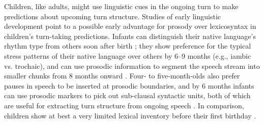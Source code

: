 \documentclass[authoryear, 12pt]{elsarticle}
\begin{document}
Children, like adults, might use linguistic cues in the ongoing turn to make predictions about upcoming turn structure. Studies of early linguistic development point to a possible early advantage for prosody over lexicosyntax in children's turn-taking predictions. Infants can distinguish their native language's rhythm type from others soon after birth \citep{mehler1988, nazzi2003}; they show preference for the typical stress patterns of their native language over others by 6--9 months (e.g., iambic vs. trochaic), and can use prosodic information to segment the speech stream into smaller chunks from 8 months onward \citep{johnson2001, morgan1995}. Four- to five-month-olds also prefer pauses in speech to be inserted at prosodic boundaries, and by 6 months infants can use prosodic markers to pick out sub-clausal syntactic units, both of which are useful for extracting turn structure from ongoing speech \citep{jusczyk1995, soderstrom2003}. In comparison, children show at best a very limited lexical inventory before their first birthday \citep{bergelson2013, shi2010}.


\end{document}
